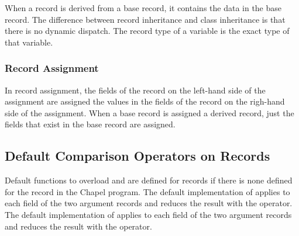 When a record is derived from a base record, it contains the data in
the base record.  The difference between record inheritance and class
inheritance is that there is no dynamic dispatch.  The record type of
a variable is the exact type of that variable.

\subsubsection{Record Assignment}
\label{Record_Assignment}

In record assignment, the fields of the record on the left-hand side
of the assignment are assigned the values in the fields of the record
on the righ-hand side of the assignment.  When a base record is
assigned a derived record, just the fields that exist in the base
record are assigned.

\subsection{Default Comparison Operators on Records}

Default functions to overload \chpl{==} and \chpl{!=} are defined for
records if there is none defined for the record in the Chapel program.
The default implementation of \chpl{==} applies \chpl{==} to each
field of the two argument records and reduces the result with
the \chpl{&&} operator.  The default implementation of \chpl{!=}
applies \chpl{!=} to each field of the two argument records and
reduces the result with the \chpl{||} operator.
